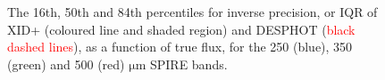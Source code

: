 \documentclass[useAMS,usenatbib]{mnras}
\begin{document}
\begin{figure}
\centering 
\caption{The 16th, 50th and 84th percentiles for inverse precision, or IQR of \textsc{XID+} (coloured line and shaded region) and \textsc{DESPHOT}  (\textcolor{red}{black dashed lines}), as a function of true flux, for the 250 (blue), 350 (green) and 500 (red) $\mathrm{\mu m}$ SPIRE bands. }\label{fig:precision}
\end{figure}
\end{document}
